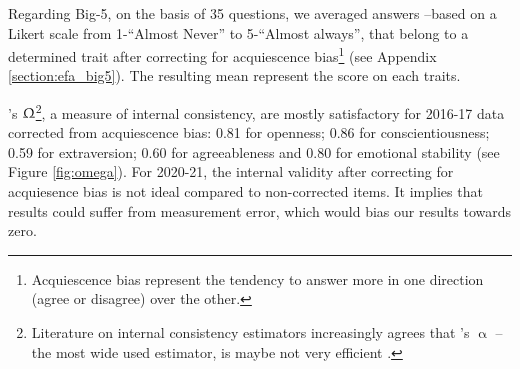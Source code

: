 \documentclass[a4paper, 11pt, onecolumn]{article}
\begin{document}
Regarding Big-5, on the basis of 35 questions, we averaged answers --based on a Likert scale from 1-``Almost Never'' to 5-``Almost always'', that belong to a determined trait after correcting for acquiescence bias\footnote{Acquiescence bias represent the tendency to answer more in one direction (agree or disagree) over the other.} (see Appendix \ref{section:efa_big5}).
The resulting mean represent the score on each traits.

\citeauthor{McDonald1999}'s $\Upomega$\footnote{Literature on internal consistency estimators increasingly agrees that \citeauthor{Cronbach1951}'s $\upalpha$ --the most wide used estimator, is maybe not very efficient \citep{Bourque2019, TrizanoHermosilla2016}.}, a measure of internal consistency, are mostly satisfactory for 2016-17 data corrected from acquiescence bias: 0.81 for openness; 0.86 for conscientiousness; 0.59 for extraversion; 0.60 for agreeableness and 0.80 for emotional stability (see Figure \ref{fig:omega}).
For 2020-21, the internal validity after correcting for acquiesence bias is not ideal compared to non-corrected items.
It implies that results could suffer from measurement error, which would bias our results towards zero.

\end{document}
